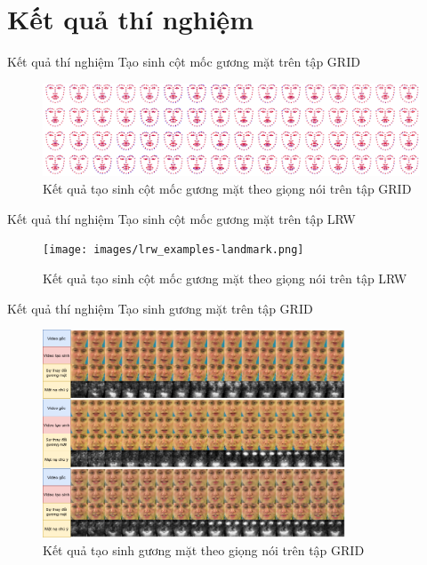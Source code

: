 \section{Kết quả thí nghiệm}\label{sec:result}
\frame{\tableofcontents[currentsection]}

\begin{frame}{Kết quả thí nghiệm}
Tạo sinh cột mốc gương mặt trên tập GRID
\begin{figure}[H]
    \centering
    \includegraphics[width=15cm]{images/grid_examples-landmark.png}
    \caption{Kết quả tạo sinh cột mốc gương mặt theo giọng nói trên tập GRID}
\end{figure}
\end{frame}

\begin{frame}{Kết quả thí nghiệm}
Tạo sinh cột mốc gương mặt trên tập LRW
\begin{figure}[H]
    \centering
    \texttt{[image: images/lrw\_examples-landmark.png]}
    \caption{Kết quả tạo sinh cột mốc gương mặt theo giọng nói trên tập LRW}
\end{figure}
\end{frame}

\begin{frame}{Kết quả thí nghiệm}
Tạo sinh gương mặt trên tập GRID
\begin{figure}[H]
    \centering
    \includegraphics[width=9cm]{images/grid_examples-face.png}
    \caption{Kết quả tạo sinh gương mặt theo giọng nói trên tập GRID}
\end{figure}
\end{frame}

